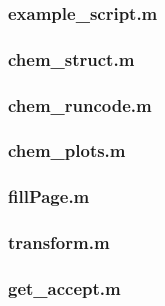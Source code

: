 \documentclass[11pt]{article}
\begin{document}
\begin{tiny}
\subsubsection*{example\_script.m}


\subsubsection*{chem\_struct.m}


\subsubsection*{chem\_runcode.m}


\subsubsection*{chem\_plots.m}


\subsubsection*{fillPage.m}


\subsubsection*{transform.m}


\subsubsection*{get\_accept.m}

\end{tiny}
\end{document}
